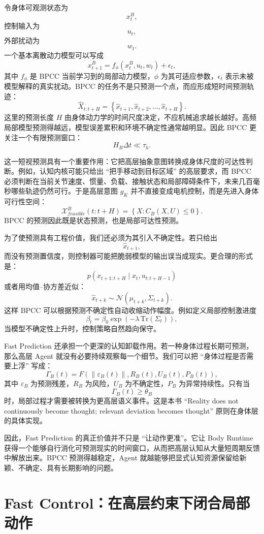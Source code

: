 令身体可观测状态为
\[
x_t^B,
\]
控制输入为
\[
u_t,
\]
外部扰动为
\[
w_t.
\]
一个基本离散动力模型可以写成
\[
x_{t+1}^B
=
f_\phi(x_t^B,u_t,w_t)
+
\epsilon_t,
\]
其中 $f_\phi$ 是 BPCC 当前学习到的局部动力模型，$\phi$ 为其可适应参数，$\epsilon_t$ 表示未被模型解释的真实扰动。BPCC 的任务不是只预测一个点，而应形成短时间预测轨迹：
\[
\hat{X}_{t:t+H}
=
\left\{
\hat x_{t+1},
\hat x_{t+2},
\ldots,
\hat x_{t+H}
\right\}.
\]
这里的预测长度 $H$ 由身体动力学的时间尺度决定，不应机械追求越长越好。高频局部模型预测得越远，模型误差累积和环境不确定性通常越明显。因此 BPCC 更关注一个有限预测窗口：
\[
H_B\Delta t
\ll
\tau_h.
\]

这一短视预测具有一个重要作用：它把高层抽象意图转换成身体尺度的可达性判断。例如，认知内核可能只给出 ``把手移动到目标区域'' 的高层要求，而 BPCC 必须判断在当前关节速度、惯量、负载、接触状态和局部障碍条件下，未来几百毫秒哪些轨迹仍然可行。于是高层意图 $g_K$ 并不直接变成电机控制，而是先进入身体可行性空间：
\[
\mathcal X_{feasible}^{B}(t:t+H)
=
\left\{
X:
C_B(X,U)\leq 0
\right\}.
\]
BPCC 的预测因此既是状态预测，也是局部可达性预测。

为了使预测具有工程价值，我们还必须为其引入不确定性。若只给出
\[
\hat x_{t+1},
\]
而没有预测置信度，则控制器可能把脆弱模型的输出误当成现实。更合理的形式是：
\[
p(x_{t+1:t+H}
\mid
x_t,u_{t:t+H-1})
\]
或者用均值--协方差近似：
\[
\hat x_{t+k}
\sim
\mathcal N(\mu_{t+k},\Sigma_{t+k}).
\]
这样 BPCC 可以根据预测不确定性自动收缩动作幅度。例如定义局部控制激进度
\[
\beta_t
=
\beta_0
\exp(-\lambda\,\mathrm{Tr}(\Sigma_t)),
\]
当模型不确定性上升时，控制策略自然趋向保守。

Fast Prediction 还承担一个更深的认知卸载作用。若一种身体过程长期可预测，那么高层 Agent 就没有必要持续观察每一个细节。我们可以把 ``身体过程是否需要上浮'' 写成：
\[
\Gamma_B(t)
=
F(
\|\varepsilon_B(t)\|,
R_B(t),
U_B(t),
P_B(t)
),
\]
其中 $\varepsilon_B$ 为预测残差，$R_B$ 为风险，$U_B$ 为不确定性，$P_B$ 为异常持续性。只有当
\[
\Gamma_B(t)\geq\theta_B
\]
时，局部过程才需要被转换为更高层语义事件。这是本书 ``Reality does not continuously become thought; relevant deviation becomes thought'' 原则在身体层的具体实现。

因此，Fast Prediction 的真正价值并不只是 ``让动作更准''。它让 Body Runtime 获得一个能够自行消化可预测现实的时间窗口，从而把高层认知从大量短周期反馈中解放出来。BPCC 预测得越稳定，Agent 就越能够把显式认知资源保留给新颖、不确定、具有长期影响的问题。

\section{Fast Control：在高层约束下闭合局部动作}

